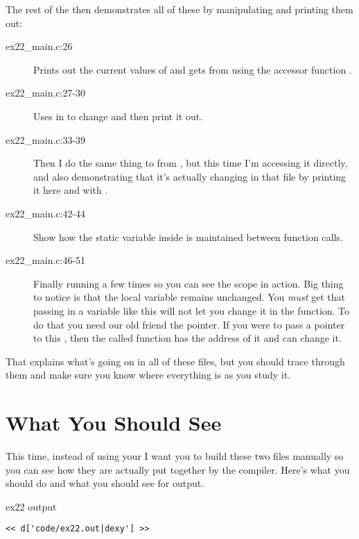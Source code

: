 The rest of the  then demonstrates all of these by
manipulating and printing them out:

\begin{description}
\item[ex22\_main.c:26] Prints out the current values of  and gets
     from  using the accessor function
    .
\item[ex22\_main.c:27-30] Uses  in  to change 
    and then print it out.
\item[ex22\_main.c:33-39] Then I do the same thing to  from ,
    but this time I'm accessing it directly, and also demonstrating that it's
    actually changing in that file by printing it here and with .
\item[ex22\_main.c:42-44] Show how the static variable  inside 
    is maintained between function calls.
\item[ex22\_main.c:46-51] Finally running  a few times so you can see
    the scope in action.  Big thing to notice is that the local 
    variable remains unchanged.  You \emph{must} get that passing in a variable
    like this will not let you change it in the function.  To do that you need
    our old friend the pointer.  If you were to pass a pointer to this ,
    then the called function has the address of it and can change it.
\end{description}

That explains what's going on in all of these files, but you should trace
through them and make sure you know where everything is as you study it.

\section{What You Should See}

This time, instead of using your  I want you to build these
two files manually so you can see how they are actually put together by
the compiler.  Here's what you should do and what you should see for output.

\begin{code}{ex22 output}
\begin{lstlisting}
<< d['code/ex22.out|dexy'] >>
\end{lstlisting}
\end{code}

